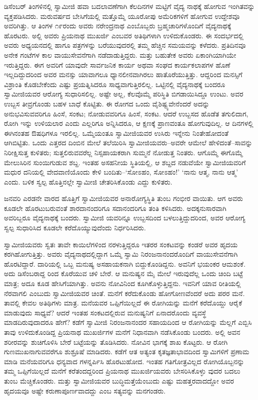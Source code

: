 ಡಿಸೆಂಬರ್ ತಿಂಗಳಿನಲ್ಲಿ ಸ್ವಾಮೀಜಿ ಹವಾ ಬದಲಾವಣೆಗಾಗಿ ಕೆಲದಿನಗಳ ಮಟ್ಟಿಗೆ ವೈದ್ಯ ನಾಥಕ್ಕೆ ಹೋಗುವ ಇಂಗಿತವನ್ನು ವ್ಯಕ್ತಪಡಿಸಿದರು. ಮರುವರ್ಷದ ಬೇಸಿಗೆಯಲ್ಲಿ ಮತ್ತೊಮ್ಮೆ ಯೂರೋಪು ಅಮೆರಿಕಗಳಿಗೆ ಹೋಗುವ ಉದ್ದೇಶವೂ ಅವರಿಗಿತ್ತು. ಆ ತಿಂಗಳ ೧೯ರಂದು ಅವರು ನರೇಂದ್ರನಾಥ ಎಂಬೊಬ್ಬರು ಬ್ರಹ್ಮಚಾರಿಗಳೊಂದಿಗೆ ವೈದ್ಯನಾಥಕ್ಕೆ ಹೊರಟರು. ಅಲ್ಲಿ ಅವರು ಪ್ರಿಯನಾಥ ಮುಖರ್ಜಿ ಎಂಬವರ ಅತಿಥಿಗಳಾಗಿ ಉಳಿದುಕೊಂಡರು. ಈ ಸಂದರ್ಭದಲ್ಲಿ ಅವರು ಅಧ್ಯಯನದಲ್ಲಿ ಹಾಗೂ ಪತ್ರಗಳನ್ನು ಬರೆಯುವುದರಲ್ಲಿ ತಮ್ಮ ಹೆಚ್ಚಿನ ಸಮಯವನ್ನು ಕಳೆದರು. ಪ್ರತಿದಿನವೂ ಅನೇಕ ಗಂಟೆಗಳ ಕಾಲ ವಾಯುಸೇವನೆಗಾಗಿ ನಡೆದಾಡುತ್ತಿದ್ದರು. ಮತ್ತು ಬಹುತೇಕ ಅವರು ಏಕಾಂಗಿಯಾಗಿಯೇ ಇರುತ್ತಿದ್ದರು. ಈಗ ಅವರಿಗೆ ಯಾವುದೇ ಸಾರ್ವಜನಿಕ ಕಾರ್ಯ ಅಥವಾ ಸಂಘದ ಕಾರ್ಯಕಲಾಪಗಳ ಹೊಣೆ ಇಲ್ಲದಿದ್ದುದರಿಂದ ಅವರ ಮನಸ್ಸು ಯಾವಾಗಲೂ ಧ್ಯಾನಲೀನವಾಗಿರಲು ಹಾತೊರೆಯುತ್ತಿತ್ತು. ಆದ್ದರಿಂದ ಮನಸ್ಸಿಗೆ ವಿಶ್ರಾಂತಿ ಕೊಡಬೇಕೆಂದು ಎಷ್ಟು ಪ್ರಯತ್ನಿಸಿದರೂ ಸಾಧ್ಯವಾಗುತ್ತಿರಲಿಲ್ಲ. ಒಟ್ಟಿನಲ್ಲಿ ವೈದ್ಯನಾಥಕ್ಕೆ ಬಂದರೂ ಸ್ವಾಮೀಜಿಯವರ ಆರೋಗ್ಯ ಸುಧಾರಿಸಲಿಲ್ಲ. ಅಷ್ಟೇ ಅಲ್ಲ, ಕೆಲವೊಮ್ಮೆ ಪರಿಸ್ಥಿತಿ ಬಿಗಡಾಯಿಸಿದ್ದೂ ಉಂಟು. ಅವರ ಉಬ್ಬಸ ತೀವ್ರಗೊಂಡು ಬಹಳ ಬಾಧೆ ಕೊಟ್ಟಿತು. ಈ ರೋಗದ ಒಂದು ವೈಶಿಷ್ಟ್ಯವೇನೆಂದರೆ ಅದನ್ನು ಅನುಭವಿಸುವವರಿಗೂ ಹಿಂಸೆ, ಸಂಕಟ; ನೋಡುವವರಿಗೂ ಹಿಂಸೆ, ಸಂಕಟ. ಆದರೆ ಉಬ್ಬಸದ ಹೊಡೆತ ತಗುಲಿದಾಗ, ರೋಗಿ ಇನ್ನು ಉಳಿಯಲಾರ ಎಂದು ಎಲ್ಲರಿಗೂ ಅನ್ನಿಸಿದರೂ, ಆ ಕ್ಷಣಕ್ಕೆ ಪ್ರಾಣವಂತೂ ಹೋಗುವುದಿಲ್ಲ. ಆ ದಿನಗಳಲ್ಲಿ ಈಗಿನಂತಹ ಔಷಧಿಗಳೂ ಇರಲಿಲ್ಲ. ಒಮ್ಮೆಯಂತೂ ಸ್ವಾಮೀಜಿಯವರ ಉಸಿರು ಇನ್ನೇನು ನಿಂತೇಹೋದಂತೆ ಆಗಿಬಿಟ್ಟಿತು. ಒಂದು ಎತ್ತರದ ದಿಂಬಿನ ಮೇಲೆ ತಲೆಯಿರಿಸಿ ಸ್ವಾಮೀಜಿಯವರು–ಅವರೇ ಆಮೇಲೆ ಹೇಳಿದಂತೆ–ಸಾವನ್ನು ನಿರೀಕ್ಷಿಸುತ್ತ ಕುಳಿತರು; ಸುತ್ತಲಿರುವವರೆಲ್ಲ ನಿಸ್ಸಹಾಯಕರಾಗಿ ಸುಮ್ಮನೆ ನೋಡುತ್ತ ನಿಂತರು. ಆಗೊಮ್ಮೆ ಈಗೊಮ್ಮೆ ಮೇಲುಸಿರಿನ ಸುಂಯಿಗುಡುವ ಶಬ್ದ. ಇಂತಹ ಅಸಹನೀಯ ಸ್ಥಿತಿಯಲ್ಲಿ, ಆ ಶಬ್ದದ ನಡುವೆಯೇ ಸ್ವಾಮೀಜಿಯವರಿಗೆ ಮಧುರ ದನಿಯಲ್ಲಿ ವೇದವಾಣಿಯೊಂದು ಕೇಳಿ ಬಂದಿತು–‘ಸೋಽಹಂ, ಸೋಽಹಂ!’ ‘ನಾನು ಆತ್ಮ, ನಾನು ಆತ್ಮ’ ಎಂದು. ಬಳಿಕ ಸ್ವಲ್ಪ ಹೊತ್ತಿನಲ್ಲೇ ಸ್ವಾಮೀಜಿ ಚೇತರಿಸಿಕೊಂಡು ಎದ್ದು ಕುಳಿತರು.

ಜನವರಿ ಎರಡನೇ ವಾರದ ಹೊತ್ತಿಗೆ ಸ್ವಾಮೀಜಿಯವರ ಅನಾರೋಗ್ಯಸ್ಥಿತಿ ತುಂಬ ಗಂಭೀರ ವಾಯಿತು. ಆಗ ಅವರು ಕೂಡಲೇ ಹೊರಟುಬರುವಂತೆ ಶಾರದಾನಂದರಿಗೂ ಸದಾನಂದರಿಗೂ ತಂತಿ ಕಳಿಸಿದರು. ಅದಕ್ಕನುಸಾರವಾಗಿ ಅವರಿಬ್ಬರೂ ವೈದ್ಯನಾಥಕ್ಕೆ ಬಂದರು. ಸ್ವಾಮೀಜಿ ಯವರಿನ್ನೂ ಉಬ್ಬಸದಿಂದ ಬಳಲುತ್ತಿದ್ದುದರಿಂದ, ಅವರ ಆರೋಗ್ಯ ಸ್ವಲ್ಪ ಸುಧಾರಿಸಿದ ಕೂಡಲೇ ಕರೆದೊಯ್ಯುವುದೆಂದು ನಿರ್ಧರಿಸಿದರು.

ಸ್ವಾಮೀಜಿಯವರು ಸ್ವತಃ ತಾವೇ ಕಾಯಿಲೆಗಳಿಂದ ನರಳುತ್ತಿದ್ದರೂ ಇತರರ ಸಂಕಟವನ್ನು ಕಂಡರೆ ಅವರ ಹೃದಯ ಕರಗಿಹೋಗುತ್ತಿತ್ತು. ಅವರು ವೈದ್ಯನಾಥದಲ್ಲಿದ್ದಾಗ ಒಮ್ಮೆ ಸ್ವಾಮಿ ನಿರಂಜನಾನಂದರೊಂದಿಗೆ ವಾಯುಸೇವನೆಗಾಗಿ ಹೊರಟಿದ್ದಾರೆ. ದಾರಿಯಲ್ಲಿ ಒಬ್ಬ ಮನುಷ್ಯ ಅಸಹಾಯಕನಾಗಿ ಬಿದ್ದುಕೊಂಡಿದ್ದನು. ಅವನಿಗೆ ಭಯಂಕರ ಆಮಶಂಕೆ. ಅದು ಡಿಸೆಂಬರಾದ್ದ ರಿಂದ ಕೊರೆಯುವ ಚಳಿ ಬೇರೆ. ಆ ಮನುಷ್ಯನ ಮೈ ಮೇಲೆ ಇರುವುದೆಲ್ಲ ಒಂದು ಚಿಂದಿ ಬಟ್ಟೆ ಮಾತ್ರ; ಅದೂ ಕೂಡ ಹೇಸಿಗೆಯಾಗಿತ್ತು. ಅವನು ನೋವಿನಿಂದ ಕೂಗಿಕೊಳ್ಳುತ್ತಿದ್ದನು. ಇವನಿಗೆ ಯಾವ ರೀತಿಯಲ್ಲಿ ನೆರವಾಗಲಿ ಎಂಬುದು ಸ್ವಾಮೀಜಿಯವರ ಚಿಂತೆ. ಮನೆಗೆ ಕರೆದುಕೊಂಡು ಹೋಗೋಣವೆಂದರೆ ಅದು ಪರರ ಮನೆ. ತಾವಲ್ಲಿ ಕೇವಲ ಅತಿಥಿಗಳು ಮಾತ್ರ. ಮನೆಯವರ ಒಪ್ಪಿಗೆಯಿಲ್ಲದೆ ಈ ರೋಗಿಯನ್ನು ಮನೆಗೆ ಕರೆದೊಯ್ದು ಆರೈಕೆ ಮಾಡುವುದು ಸಾಧ್ಯವೆ? ಆದರೆ ಇಂತಹ ಸಂಕಟದಲ್ಲಿರುವ ಮನುಷ್ಯನಿಗೆ ಏನಾದರೊಂದು ವ್ಯವಸ್ಥೆ ಮಾಡದಿರುವುದಾದರೂ ಹೇಗೆ? ಕಡೆಗೆ ಸ್ವಾಮೀಜಿ ನಿರಂಜನಾನಂದರ ಸಹಾಯದಿಂದ ಆ ರೋಗಿಯನ್ನು ಮೆಲ್ಲಗೆ ಎಬ್ಬಿಸಿ ತಾವು ಉಳಿದುಕೊಂಡಿದ್ದ ಪ್ರಿಯನಾಥ ಮುಖರ್ಜಿಗಳ ಮನೆಗೆ ನಿಧಾನವಾಗಿ ನಡೆಸಿಕೊಂಡು ಬಂದರು. ಅಲ್ಲಿ ಅವನ ಶರೀರವನ್ನು ಶುಚಿಗೊಳಿಸಿ ಬೇರೆ ಬಟ್ಟೆಯನ್ನು ತೊಡಿಸಿದರು. ನೋವಿನ ಭಾಗಕ್ಕೆ ಶಾಖ ಕೊಟ್ಟರು. ಆ ರೋಗಿ ಗುಣಮುಖನಾಗುವವರೆಗೂ ಶುಶ್ರೂಷೆ ಮಾಡಿದರು. ಕಡೆಗೆ ಆತ ಅತ್ಯಂತ ಕೃತಜ್ಞತಾಭಾವದಿಂದ ಸ್ವಾಮಿಗಳಿಗೆ ಪ್ರಣಾಮ ಮಾಡಿ ಮನೆಯವರಿಗೂ ಧನ್ಯವಾದ ಗಳನ್ನರ್ಪಿಸಿ ಹೊರಟುಹೋದ. ಇಂತಹ ಗತಿಗೋತ್ರವಿಲ್ಲದ ರೋಗಿಯೊಬ್ಬನನ್ನು ತಮ್ಮ ಒಪ್ಪಿಗೆಯಿಲ್ಲದೆ ಮನೆಗೆ ಕರೆತಂದದ್ದರಿಂದ ಪ್ರಿಯನಾಥ ಮುಖರ್ಜಿಯವರು ಬೇಸರಿಸಿಕೊಳ್ಳು ವುದರ ಬದಲು ತುಂಬ ಮೆಚ್ಚಿಕೊಂಡರು. ಮತ್ತು ಸ್ವಾಮೀಜಿಯವರ ಬುದ್ಧಿಮತ್ತೆಯೆಂಬುದು ಎಷ್ಟು ಮಹತ್ತರವಾದದ್ದೋ ಅವರ ಹೃದಯವೂ ಅಷ್ಟೇ ಕರುಣಾಪೂರ್ಣವಾದದ್ದು ಎಂಬ ಸತ್ಯವನ್ನು ಮನಗಂಡರು.

